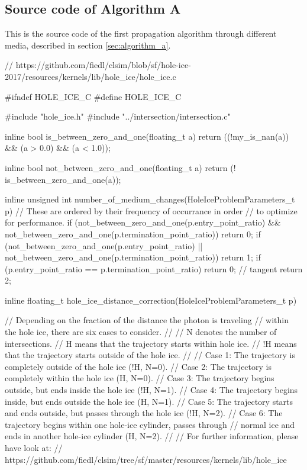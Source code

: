 
\subsection{Source code of Algorithm A}
\label{sec:algorithm_a_source}

This is the source code of the first propagation algorithm through different media, described in section \ref{sec:algorithm_a}.


\begin{ccode}
// https://github.com/fiedl/clsim/blob/sf/hole-ice-2017/resources/kernels/lib/hole_ice/hole_ice.c

#ifndef HOLE_ICE_C
#define HOLE_ICE_C

#include "hole_ice.h"
#include "../intersection/intersection.c"

inline bool is_between_zero_and_one(floating_t a) {
  return ((!my_is_nan(a)) && (a > 0.0) && (a < 1.0));
}

inline bool not_between_zero_and_one(floating_t a) {
  return (! is_between_zero_and_one(a));
}

inline unsigned int number_of_medium_changes(HoleIceProblemParameters_t p)
{
  // These are ordered by their frequency of occurrance in order
  // to optimize for performance.
  if (not_between_zero_and_one(p.entry_point_ratio) && not_between_zero_and_one(p.termination_point_ratio)) return 0;
  if (not_between_zero_and_one(p.entry_point_ratio) || not_between_zero_and_one(p.termination_point_ratio)) return 1;
  if (p.entry_point_ratio == p.termination_point_ratio) return 0; // tangent
  return 2;
}

inline floating_t hole_ice_distance_correction(HoleIceProblemParameters_t p)
{
  // Depending on the fraction of the distance the photon is traveling
  // within the hole ice, there are six cases to consider.
  //
  // N  denotes the number of intersections.
  // H  means that the trajectory starts within hole ice.
  // !H means that the trajectory starts outside of the hole ice.
  //
  // Case 1: The trajectory is completely outside of the hole ice (!H, N=0).
  // Case 2: The trajectory is completely within the hole ice (H, N=0).
  // Case 3: The trajectory begins outside, but ends inside the hole ice (!H, N=1).
  // Case 4: The trajectory begins inside, but ends outside the hole ice (H, N=1).
  // Case 5: The trajectory starts and ends outside, but passes through the hole ice (!H, N=2).
  // Case 6: The trajectory begins within one hole-ice cylinder, passes through
  //           normal ice and ends in another hole-ice cylinder (H, N=2).
  //
  // For further information, please have look at:
  // https://github.com/fiedl/clsim/tree/sf/master/resources/kernels/lib/hole_ice

}
\end{ccode}
